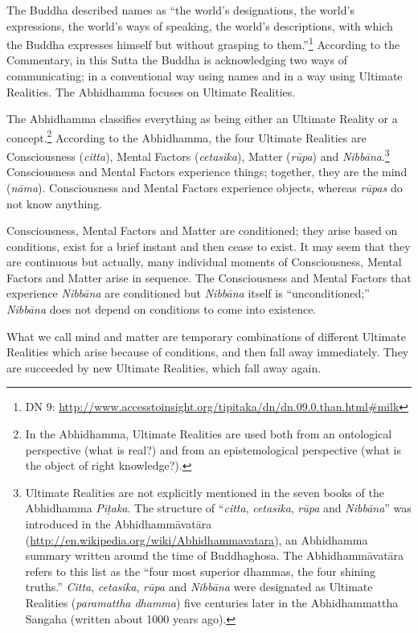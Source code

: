 The Buddha described names as “the world’s designations, the world’s expressions, the world’s ways of speaking, the world’s descriptions, with which the Buddha expresses himself but without grasping to them.”\footnote{DN 9: \url{http://www.accesstoinsight.org/tipitaka/dn/dn.09.0.than.html\#milk}} According to the Commentary, in this Sutta the Buddha is acknowledging two ways of communicating; in a conventional way using names and in a way using Ultimate Realities. The Abhidhamma focuses on Ultimate Realities.

The Abhidhamma classifies everything as being either an Ultimate Reality or a concept.\footnote{In the Abhidhamma, Ultimate Realities are used both from an ontological perspective (what is real?) and from an epistemological perspective (what is the object of right knowledge?).} According to the Abhidhamma, the four Ultimate Realities are Consciousness (\textit{citta}), Mental Factors (\textit{cetasika}), Matter (\textit{rūpa}) and \textit{Nibbāna}.\footnote{Ultimate Realities are not explicitly mentioned in the seven books of the Abhidhamma \textit{Piṭaka}. The structure of “\textit{citta}, \textit{cetasika}, \textit{rūpa} and \textit{Nibbāna}” was introduced in the Abhidhammāvatāra (\url{http://en.wikipedia.org/wiki/Abhidhammavatara}), an Abhidhamma summary written around the time of Buddhaghosa. The Abhidhammāvatāra refers to this list as the “four most superior dhammas, the four shining truths.” \textit{Citta}, \textit{cetasika}, \textit{rūpa} and \textit{Nibbāna} were designated as Ultimate Realities (\textit{paramattha dhamma}) five centuries later in the Abhidhammattha Sangaha (written about 1000 years ago).} Consciousness and Mental Factors experience things; together, they are the mind (\textit{nāma}). Consciousness and Mental Factors experience objects, whereas \textit{rūpas} do not know anything. 

Consciousness, Mental Factors and Matter are conditioned; they arise based on conditions, exist for a brief instant and then cease to exist. It may seem that they are continuous but actually, many individual moments of Consciousness, Mental Factors and Matter arise in sequence. The Consciousness and Mental Factors that experience \textit{Nibbāna} are conditioned but \textit{Nibbāna} itself is “unconditioned;” \textit{Nibbāna} does not depend on conditions to come into existence.

What we call mind and matter are temporary combinations of different Ultimate Realities which arise because of conditions, and then fall away immediately. They are succeeded by new Ultimate Realities, which fall away again.

